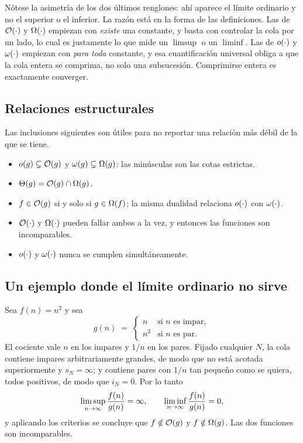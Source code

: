 \documentclass[11pt,letterpaper]{article}
\begin{document}
Nótese la asimetría de los dos últimos renglones: ahí aparece el
límite ordinario y no el superior o el inferior. La razón está en la
forma de las definiciones. Las de $\mathcal{O}\!\left(\cdot\right)$ y $\Omega\!\left(\cdot\right)$
empiezan con \emph{existe} una constante, y basta con controlar la
cola por un lado, lo cual es justamente lo que mide un $\limsup$ o un
$\liminf$. Las de $o\!\left(\cdot\right)$ y $\omega\!\left(\cdot\right)$ empiezan con
\emph{para toda} constante, y esa cuantificación universal obliga a
que la cola entera se comprima, no solo una subsucesión. Comprimirse
entera es exactamente converger.


\subsection*{Relaciones estructurales}

Las inclusiones siguientes son útiles para no reportar una relación
más débil de la que se tiene.

\begin{itemize}[leftmargin=1.4em,itemsep=0.2em]
    \item $o\!\left(g\right) \subsetneq \mathcal{O}\!\left(g\right)$ y
          $\omega\!\left(g\right) \subsetneq \Omega\!\left(g\right)$: las minúsculas son las cotas
          estrictas.
    \item $\Theta\!\left(g\right) = \mathcal{O}\!\left(g\right) \cap \Omega\!\left(g\right)$.
    \item $f \in \mathcal{O}\!\left(g\right)$ si y solo si $g \in \Omega\!\left(f\right)$; la misma
          dualidad relaciona $o\!\left(\cdot\right)$ con $\omega\!\left(\cdot\right)$.
    \item $\mathcal{O}\!\left(\cdot\right)$ y $\Omega\!\left(\cdot\right)$ pueden fallar ambos a la vez, y
          entonces las funciones son incomparables.
    \item $o\!\left(\cdot\right)$ y $\omega\!\left(\cdot\right)$ nunca se cumplen
          simultáneamente.
\end{itemize}


\subsection*{Un ejemplo donde el límite ordinario no sirve}

Sea $f(n) = n^2$ y sea
\[
    g(n) \;=\;
    \begin{cases}
        n   & \text{si $n$ es impar},\\
        n^3 & \text{si $n$ es par}.
    \end{cases}
\]
El cociente vale $n$ en los impares y $1/n$ en los pares. Fijado
cualquier $N$, la cola contiene impares arbitrariamente grandes, de
modo que no está acotada superiormente y $s_N = \infty$; y contiene
pares con $1/n$ tan pequeño como se quiera, todos positivos, de modo
que $i_N = 0$. Por lo tanto
\[
    \limsup_{n \to \infty} \frac{f(n)}{g(n)} = \infty,
    \qquad
    \liminf_{n \to \infty} \frac{f(n)}{g(n)} = 0,
\]
y aplicando los criterios se concluye que $f \notin \mathcal{O}\!\left(g\right)$ y
$f \notin \Omega\!\left(g\right)$. Las dos funciones son incomparables.
\end{document}
